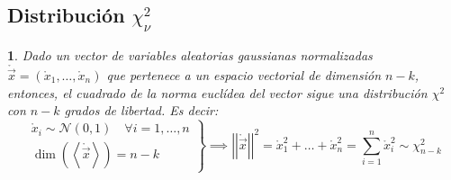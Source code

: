 \documentclass[11pt,a4paper,spanish]{article}
\numberwithin{equation}{section}
\numberwithin{table}{section}
\numberwithin{figure}{section}
\theoremstyle{definition}
\theoremstyle{remark}
\theoremstyle{definition}
\theoremstyle{remark}
\theoremstyle{plain}
\newtheorem{prop}{\protect\propositionname}[section]
\theoremstyle{plain}
\theoremstyle{plain}
\theoremstyle{plain}
\theoremstyle{plain}
\theoremstyle{plain}
\providecommand{\propositionname}{Proposición}
\begin{document}
	\subsection{Distribución $\chi_{\nu}^{2}$}
	\begin{prop}
		\label{prop:vector gaussiano chi cuadrado}Dado un vector de variables
		aleatorias gaussianas normalizadas $\mathring{\vec{x}}=\left(\mathring{x}_{1},\dots,\mathring{x}_{n}\right)$
		que pertenece a un espacio vectorial de dimensión $n-k$, entonces,
		el cuadrado de la norma euclídea del vector sigue una distribución
		$\chi^{2}$ con $n-k$ grados de libertad. Es decir:
		\[
		\left.\begin{matrix}\mathring{x}_{i}\sim\mathcal{N}\left(0,1\right)\quad\forall i=1,\dots,n\\
			\dim\left(\left\langle \mathring{\vec{x}}\right\rangle \right)=n-k
		\end{matrix}\right\} \implies\left|\left|\mathring{\vec{x}}\right|\right|^{2}=\mathring{x}_{1}^{2}+\dots+\mathring{x}_{n}^{2}=\sum_{i=1}^{n}\mathring{x}_{i}^{2}\sim\chi_{n-k}^{2}
		\]
	\end{prop}
\end{document}
